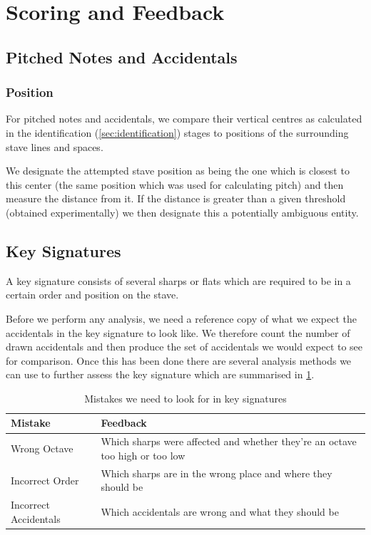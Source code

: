 \section{Scoring and Feedback}
\label{sec:scoring}

\subsection{Pitched Notes and Accidentals}
\label{sec:pitched-notes}

\subsubsection{Position}\label{sec:scoring-position}

For pitched notes and accidentals, we compare their vertical centres as calculated in the identification (\cref{sec:identification}) stages to positions of the surrounding stave lines and spaces.

We designate the attempted stave position as being the one which is closest to this center (the same position which was used for calculating pitch) and then measure the distance from it. If the distance is greater than a given threshold (obtained experimentally) we then designate this a potentially ambiguous entity.

\subsection{Key Signatures}

A key signature consists of several sharps or flats which are required to be in a certain order and position on the stave.

Before we perform any analysis, we need a reference copy of what we expect the accidentals in the key signature to look like. We therefore count the number of drawn accidentals and then produce the set of accidentals we would expect to see for comparison. Once this has been done there are several analysis methods we can use to further assess the key signature which are summarised in \cref{table:key-signature-errors}.

\begin{table}[H]
    \renewcommand{\arraystretch}{1.6}
    \begin{tabularx}{\textwidth}{ lX }
        \toprule
        Mistake & Feedback \\
        \midrule
        Wrong Octave & Which sharps were affected and whether they're an octave too high or too low \\
        Incorrect Order & Which sharps are in the wrong place and where they should be \\
        Incorrect Accidentals & Which accidentals are wrong and what they should be \\
        \bottomrule
    \end{tabularx}

    \caption{Mistakes we need to look for in key signatures}
    \label{table:key-signature-errors}
\end{table}

